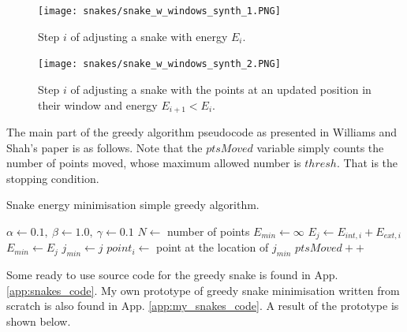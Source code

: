 \documentclass[a4paper]{article}
\begin{document}
\begin{multicols}{2}
\begin{figure}[H]
	\centering %
    	\texttt{[image: snakes/snake\_w\_windows\_synth\_1.PNG]}
    \caption{Step $i$ of adjusting a snake with energy $E_i$.}
\end{figure}
\columnbreak
\begin{figure}[H]
	\centering %
    	\texttt{[image: snakes/snake\_w\_windows\_synth\_2.PNG]}
    \caption{Step $i$ of adjusting a snake with the points at an updated position in their window and energy $E_{i+1}<E_i$.}
\end{figure}
\end{multicols}
The main part of the greedy algorithm pseudocode as presented in Williams and Shah's paper \TODO[ref] is as follows. Note that the $ptsMoved$ variable simply counts the number of points moved, whose maximum allowed number is $thresh$. That is the stopping condition.
\begin{algorithm}[H] %
\caption{Snake energy minimisation simple greedy algorithm.}
\label{alg:ff_pseudo_final}
\begin{algorithmic}[1]
 
\State $\alpha\leftarrow 0.1,\ \beta\leftarrow 1.0,\ \gamma\leftarrow 0.1$ 
\State $N \leftarrow$ number of points
\Do {}
\State $E_{min} \leftarrow \infty$
 
\State $E_j \leftarrow E_{int,i} + E_{ext,i}$ 
\State $E_{min} \leftarrow E_j$
\State $j_{min} \leftarrow j$
\EndIf
\EndFor
\State $point_i \leftarrow$ point at the location of $j_{min}$
 
\State $ptsMoved++$
\EndIf
\EndFor
{}
\EndProcedure
\end{algorithmic}
\end{algorithm}
Some ready to use source code for the greedy snake is found in App. \ref{app:snakes_code}. My own prototype of greedy snake minimisation written from scratch is also found in App. \ref{app:my_snakes_code}. A result of the prototype is shown below.\\
\end{document}
